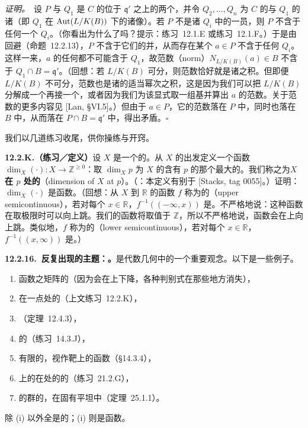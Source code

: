 \emph{证明。}\ 设 $P$ 与 $Q_1$ 是 $C$ 的位于 $\mathfrak{q}'$ 之上的两个\trPrimeIdeal，并令 $Q_2,\dots,Q_n$ 为 $C$ 的与 $Q_1$ \trConjugate{}的诸\trPrimeIdeal{}（即 $Q_1$ 在 $\operatorname{Aut}(L/K(B))$ 下的诸像）。若 $P$ 不是诸 $Q_i$ 中的一员，则 $P$ 不含于任何一个 $Q_i$。（你看出为什么了吗？提示：\mbox{练习~12.1.E} 或\mbox{练习~12.1.F}。）于是由\trPrimeIdeal{}回避（命题~12.2.13），$P$ 不含于它们的并，从而存在某个 $a\in P$ 不含于任何 $Q_i$。这样一来，$a$ 的任何\trConjugate{}都不可能含于 $Q_1$，故范数（norm）$N_{L/K(B)}(a)\in B$ 不含于 $Q_1\cap B=\mathfrak{q}'$。（回想：若 $L/K(B)$ 可分，则范数恰好就是诸\trConjugate{}之积。但即便 $L/K(B)$ 不可分，范数也是诸\trConjugate{}的适当幂次之积，这是因为我们可以把 $L/K(B)$ 分解成一个\trSeparable\trExtension{}再接一个\trPurelyInseparable\trExtension，或者因为我们为该\trExtension{}显式取一组基并算出 $a$ 的范数。关于范数的更多内容见 [Lan, \S VI.5]。）但由于 $a\in P$，它的范数落在 $P$ 中，同时也落在 $B$ 中，从而落在 $P\cap B=\mathfrak{q}'$ 中，得出矛盾。\hfill$\square$

我们以几道练习收尾，供你操练与开窍。

\textbf{12.2.K.（练习／定义）}\quad 设 $X$ 是一个\trFiniteDimensional{}的\trNoetherian{}\trScheme。从 $X$ 的\trUnderlyingSet{}出发定义一个函数 $\dim_X(\cdot)\colon X\to\mathbb{Z}^{\ge0}$：取 $\dim_X p$ 为 $X$ 的含有 $p$ 的那个最大\trIrreducibleComponent{}的\trDimension。我们称之为\textbf{$X$ 在 $p$ 处的\trDimension}（dimension of $X$ at $p$）。（\trhCaveat{}：本定义有别于 [Stacks, tag 0055]。）证明：$\dim_X(\cdot)$ 是\trUpperSemicontinuous{}函数。（回想：从\trTopologicalSpace{} $X$ 到 $\mathbb{R}$ 的函数 $f$ 称为\textbf{\trUpperSemicontinuous}的（upper semicontinuous），若对每个 $x\in\mathbb{R}$，$f^{-1}((-\infty,x))$ 是\trOpenSet。不严格地说：这种函数在取极限时可以向上跳。我们的\trUpperSemicontinuous{}函数将取值于 $\mathbb{Z}$，所以不严格地说，函数会在\trClosedSubset{}上向上跳。类似地，$f$ 称为\textbf{\trLowerSemicontinuous}的（lower semicontinuous），若对每个 $x\in\mathbb{R}$，$f^{-1}((x,\infty))$ 是\trOpenSet。）

\textbf{12.2.16.\ 反复出现的主题：\trSemicontinuity。}\quad \trSemicontinuity{}是代数几何中的一个重要观念。以下是一些例子。
\begin{enumerate}[label=(\roman*)]
  \item 函数之矩阵的\trRank{}（因为\trRank{}会在\trClosedSubset{}上下降，各种判别式在那些地方消失），
  \item \trVariety{}在一点处的\trDimension{}（上文\mbox{练习~12.2.K}），
  \item \trFiber\trDimension{}（定理~12.4.3），
  \item \trFiniteType\trQCSheaf{}的\trRank{}（\mbox{练习~14.3.J}），
  \item 有限\trMorphism{}的\trDegree，视作靶上的函数（\S14.3.4），
  \item \trAlgClosedField{}上的\trVariety{}在\trClosedPoint{}处的\trTangentSpace{}的\trDimension{}（\mbox{练习~21.2.G}），
  \item \trCoherentSheaf{}的\trCohomology{}群的\trRank，在固有平坦\trFamily{}中（\trSemicontinuity{}定理~25.1.1）。
\end{enumerate}
除 (i) 以外全是\trUpperSemicontinuous{}的；(i) 则是\trLowerSemicontinuous{}函数。

